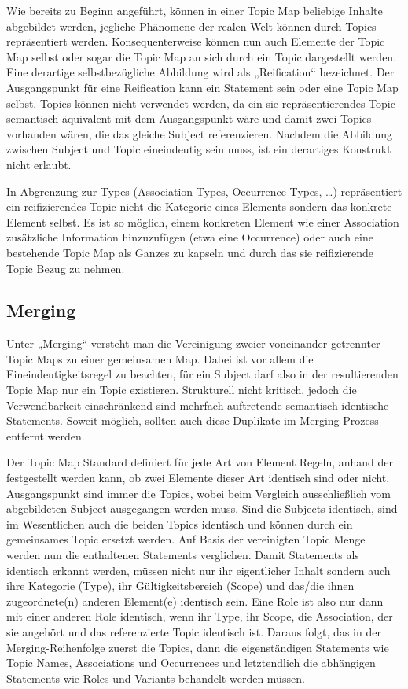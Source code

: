 Wie bereits zu Beginn angeführt, können in einer Topic Map beliebige Inhalte abgebildet werden, jegliche Phänomene der realen Welt können durch Topics repräsentiert werden. Konsequenterweise können nun auch Elemente der Topic Map selbst oder sogar die Topic Map an sich durch ein Topic dargestellt werden. Eine derartige selbstbezügliche Abbildung wird als „Reification“ bezeichnet. Der Ausgangspunkt für eine Reification kann ein Statement sein oder eine Topic Map selbst. Topics können nicht verwendet werden, da ein sie repräsentierendes Topic semantisch äquivalent mit dem Ausgangspunkt wäre und damit zwei Topics vorhanden wären, die das gleiche Subject referenzieren. Nachdem die Abbildung zwischen Subject und Topic eineindeutig sein muss, ist ein derartiges Konstrukt nicht erlaubt.

In Abgrenzung zur Types (Association Types, Occurrence Types, \ldots) repräsentiert ein reifizierendes Topic nicht die Kategorie eines Elements sondern das konkrete Element selbst. Es ist so möglich, einem konkreten Element wie einer Association zusätzliche Information hinzuzufügen (etwa eine Occurrence) oder auch eine bestehende Topic Map als Ganzes zu kapseln und durch das sie reifizierende Topic Bezug zu nehmen. 


\subsection{Merging} %
\label{ssub:merging}

Unter „Merging“ versteht man die Vereinigung zweier voneinander getrennter Topic Maps zu einer gemeinsamen Map. Dabei ist vor allem die Eineindeutigkeitsregel zu beachten, für ein Subject darf also in der resultierenden Topic Map nur ein Topic existieren. Strukturell nicht kritisch, jedoch die Verwendbarkeit einschränkend sind mehrfach auftretende semantisch identische Statements. Soweit möglich, sollten auch diese Duplikate im Merging-Prozess entfernt werden.

Der Topic Map Standard definiert für jede Art von Element Regeln, anhand der festgestellt werden kann, ob zwei Elemente dieser Art identisch sind oder nicht. Ausgangspunkt sind immer die Topics, wobei beim Vergleich ausschließlich vom abgebildeten Subject ausgegangen werden muss. Sind die Subjects identisch, sind im Wesentlichen auch die beiden Topics identisch und können durch ein gemeinsames Topic ersetzt werden. Auf Basis der vereinigten Topic Menge werden nun die enthaltenen Statements verglichen. Damit Statements als identisch erkannt werden, müssen nicht nur ihr eigentlicher Inhalt sondern auch ihre Kategorie (Type), ihr Gültigkeitsbereich (Scope) und das/die ihnen zugeordnete(n) anderen Element(e) identisch sein. Eine Role ist also nur dann mit einer anderen Role identisch, wenn ihr Type, ihr Scope, die Association, der sie angehört und das referenzierte Topic identisch ist. Daraus folgt, das in der Merging-Reihenfolge zuerst die Topics, dann die eigenständigen Statements wie Topic Names, Associations und Occurrences und letztendlich die abhängigen Statements wie Roles und Variants behandelt werden müssen.

